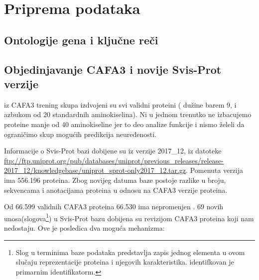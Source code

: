 
\chapter{Priprema podataka} %

\label{Priprema_podataka} %





\section{Ontologije gena i ključne reči}



\section{Objedinjavanje CAFA3 i novije Svis-Prot verzije}

iz CAFA3 trening skupa izdvojeni su svi validni proteini ( dužine barem 9, i
azbukom od 20 standardnih aminokiselina). Ni u jednom trenutko ne izbacujemo
proteine manje od 40 aminokiseline jer to deo analize funkcije i nismo želeli
da ograničimo skup mogućih predikcija neuređenosti.

Informacije o Svis-Prot bazi dobijene su iz verzije 2017\_12, iz datoteke
\url{ftp://ftp.uniprot.org/pub/databases/uniprot/previous_releases/release-2017_12/knowledgebase/uniprot_sprot-only2017_12.tar.gz}.
Pomenuta verzija ima 556.196 proteina. Zbog novijeg datuma baze postoje razlike
u broju, sekvencama i  anotacijama proteina u odnosu na CAFA3 verzije proteina.

Od 66.599 validnih CAFA3 proteina 66.530 ima nepromenjen  .  69 novih unosa(slogova\footnote{ Slog
   u terminima baze podataka predstavlja zapis jednog elementa u
ovom slučaju reprezentacije proteina i njegovih karakteristika.  identifkovan
je primarnim identifikatorm.  }) u Svis-Prot bazu dobijena su revizijom CAFA3
proteina koji nam nedostaju.  Ove je posledica dva moguća mehanizma:

